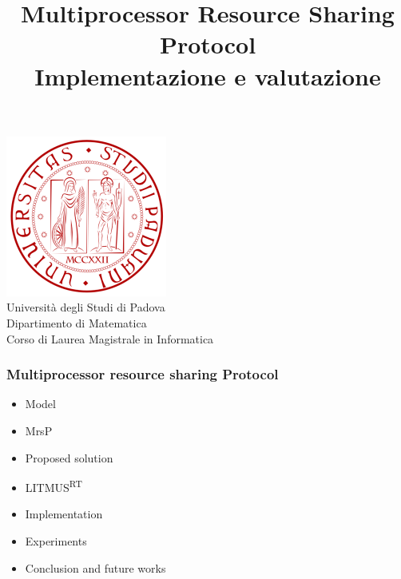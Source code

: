 \documentclass{beamer}
\DeclarePairedDelimiter\ceil{\lceil}{\rceil}
\begin{document}
\title{Multiprocessor Resource Sharing Protocol \\
Implementazione e valutazione}

\begin{frame}
\centering
\includegraphics{images/unipd-logo.png}\\%
{Università degli Studi di Padova}\\
{Dipartimento di Matematica}\\[0.1cm]
{Corso di Laurea Magistrale in Informatica}\\[0.1cm]

\titlepage
\end{frame}

\begin{frame}
\frametitle{Multiprocessor resource sharing Protocol}
\begin{itemize}
\item Model
\item MrsP
\item Proposed solution
\item LITMUS\textsuperscript{RT}
\item Implementation
\item Experiments
\item Conclusion and future works
\end{itemize}
\end{frame}

\end{document}
